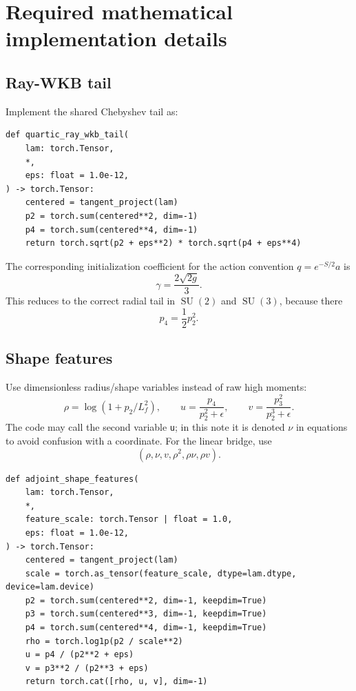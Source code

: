 \documentclass[11pt]{article}
\newcommand{\SU}{\operatorname{SU}}
\begin{document}
\section{Required mathematical implementation details}

\subsection{Ray-WKB tail}

Implement the shared Chebyshev tail as:

\begin{lstlisting}[style=pythonstyle]
def quartic_ray_wkb_tail(
    lam: torch.Tensor,
    *,
    eps: float = 1.0e-12,
) -> torch.Tensor:
    centered = tangent_project(lam)
    p2 = torch.sum(centered**2, dim=-1)
    p4 = torch.sum(centered**4, dim=-1)
    return torch.sqrt(p2 + eps**2) * torch.sqrt(p4 + eps**4)
\end{lstlisting}

The corresponding initialization coefficient for the action convention \(q=e^{-S/2}a\) is
\begin{equation}
\gamma=\frac{2\sqrt{2g}}{3}.
\end{equation}
This reduces to the correct radial tail in \(\SU(2)\) and \(\SU(3)\), because there
\begin{equation}
p_4=\frac12p_2^2.
\end{equation}

\subsection{Shape features}

Use dimensionless radius/shape variables instead of raw high moments:
\begin{equation}
\rho=\log(1+p_2/L_f^2),\qquad
u=\frac{p_4}{p_2^2+\epsilon},\qquad
v=\frac{p_3^2}{p_2^3+\epsilon}.
\end{equation}
The code may call the second variable \texttt{u}; in this note it is denoted \(\nu\) in equations to avoid confusion with a coordinate. For the linear bridge, use
\begin{equation}
(\rho,\nu,v,\rho^2,\rho\nu,\rho v).
\end{equation}

\begin{lstlisting}[style=pythonstyle]
def adjoint_shape_features(
    lam: torch.Tensor,
    *,
    feature_scale: torch.Tensor | float = 1.0,
    eps: float = 1.0e-12,
) -> torch.Tensor:
    centered = tangent_project(lam)
    scale = torch.as_tensor(feature_scale, dtype=lam.dtype, device=lam.device)
    p2 = torch.sum(centered**2, dim=-1, keepdim=True)
    p3 = torch.sum(centered**3, dim=-1, keepdim=True)
    p4 = torch.sum(centered**4, dim=-1, keepdim=True)
    rho = torch.log1p(p2 / scale**2)
    u = p4 / (p2**2 + eps)
    v = p3**2 / (p2**3 + eps)
    return torch.cat([rho, u, v], dim=-1)
\end{lstlisting}
\end{document}

